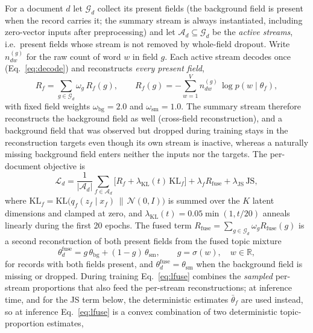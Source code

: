 \documentclass[Journal,letterpaper]{ascelike-new}
\begin{document}
For a document $d$ let $\mathcal{G}_d$ collect its present fields (the background field is present
when the record carries it; the summary stream is always instantiated, including zero-vector
inputs after preprocessing) and let
$\mathcal{A}_d\subseteq\mathcal{G}_d$ be the \emph{active streams}, i.e.\ present fields whose
stream is not removed by whole-field dropout. Write $n^{(g)}_{dw}$ for the raw count of word $w$
in field $g$. Each active stream decodes once (Eq.~\eqref{eq:decode}) and reconstructs
\emph{every present field},
\begin{equation}
R_f=\sum_{g\in\mathcal{G}_d}\omega_g\,R_f(g),\qquad
R_f(g)=-\sum_{w=1}^{V} n^{(g)}_{dw}\,\log p\!\left(w\mid\theta_f\right),
\label{eq:recon}
\end{equation}
with fixed field weights $\omega_{\mathrm{bg}}=2.0$ and $\omega_{\mathrm{sm}}=1.0$. The summary
stream therefore reconstructs the background field as well (cross-field reconstruction), and a
background field that was observed but dropped during training stays in the reconstruction
targets even though its own stream is inactive, whereas a naturally missing background field
enters neither the inputs nor the targets. The per-document objective is
\begin{equation}
\mathcal{L}_d=\frac{1}{|\mathcal{A}_d|}\sum_{f\in\mathcal{A}_d}
\Big[R_f+\lambda_{\mathrm{KL}}(t)\,\mathrm{KL}_f\Big]
+\lambda_f R_{\mathrm{fuse}}+\lambda_{\mathrm{JS}}\,\mathrm{JS},
\label{eq:total}
\end{equation}
where $\mathrm{KL}_f=\mathrm{KL}\big(q_f(z_f\mid x_f)\,\|\,\mathcal N(0,I)\big)$ is summed over
the $K$ latent dimensions and clamped at zero, and $\lambda_{\mathrm{KL}}(t)=0.05\min(1,t/20)$
anneals linearly during the first 20 epochs. The fused term
$R_{\mathrm{fuse}}=\sum_{g\in\mathcal{G}_d}\omega_g R_{\mathrm{fuse}}(g)$ is a second
reconstruction of both present fields from the fused topic mixture
\begin{equation}
\theta_d^{\mathrm{fuse}}=g\,\theta_{\mathrm{bg}}+(1-g)\,\theta_{\mathrm{sm}},
\qquad g=\sigma(w),\quad w\in\mathbb{R},
\label{eq:lfuse}
\end{equation}
for records with both fields present, and
$\theta_d^{\mathrm{fuse}}=\theta_{\mathrm{sm}}$ when the background field is missing or
dropped. During training Eq.~\eqref{eq:lfuse} combines the \emph{sampled} per-stream
proportions that also feed the per-stream reconstructions; at inference time, and for the JS
term below, the deterministic estimates $\bar\theta_f$ are used instead, so at inference
Eq.~\eqref{eq:lfuse} is a convex combination of two deterministic topic-proportion estimates,
\end{document}
